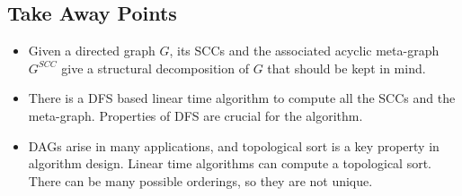 \documentclass[12pt]{article}
\begin{document}
\subsection{Take Away Points}
\begin{itemize}
    \item Given a directed graph $G$, its SCCs and the associated acyclic meta-graph $G^{SCC}$ give a structural decomposition of $G$ that should be kept in mind.
    \item There is a DFS based linear time algorithm to compute all the SCCs and the meta-graph. Properties of DFS are crucial for the algorithm.
    \item DAGs arise in many applications, and topological sort is a key property in algorithm design. Linear time algorithms can compute a topological sort. There can be many possible orderings, so they are not unique.
\end{itemize}
\end{document}
